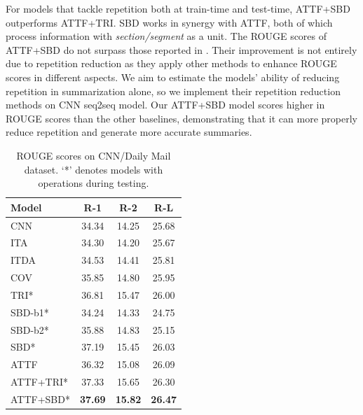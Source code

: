 For models that tackle repetition both at train-time and test-time, 
ATTF+SBD outperforms ATTF+TRI.
SBD works in synergy with ATTF, both of which process 
information with \textit{section/segment} as a unit.
The ROUGE scores of ATTF+SBD do not surpass
those reported in \cite{SeeLM17,PaulusXS17,FanGA18}. 
Their improvement is not entirely
due to repetition reduction 
as they apply other methods to enhance ROUGE scores 
in different aspects. 
We aim to estimate the models' ability of
reducing repetition in summarization alone,
so we implement their repetition reduction methods 
on CNN seq2seq model. Our ATTF+SBD model 
scores higher in ROUGE scores than the other baselines, 
demonstrating that it can more properly reduce 
repetition and generate more accurate summaries.

\begin{table}[th]
	\centering
	\scriptsize
	\begin{tabular}{|l|c|c|c|}
		\hline
		Model &   R-1 & R-2 & R-L \\
		\hline
		CNN &  34.34 & 14.25 & 25.68 \\
		ITA &  34.30 & 14.20 & 25.67 \\
		ITDA & 34.53 & 14.41 &  25.81 \\
	    COV	& 35.85 & 14.80 &  25.95 \\
        TRI* & 36.81 & 15.47 & 26.00 \\
		\hline
		SBD-b1* & 34.24 & 14.33 & 24.75 \\
		SBD-b2* & 35.88 & 14.83 & 25.15 \\
		SBD* & 37.19 & 15.45 & 26.03 \\
		ATTF & 36.32 & 15.08 & 26.09 \\
		ATTF+TRI* & 37.33 & 15.65 & 26.30 \\
		ATTF+SBD* & \bf 37.69 & \bf 15.82 & \bf 26.47 \\
		\hline
	\end{tabular}
	\caption{ROUGE scores on CNN/Daily Mail dataset. `*' denotes 
models with operations during testing.}
	\label{tab:eval_main}
\end{table}


